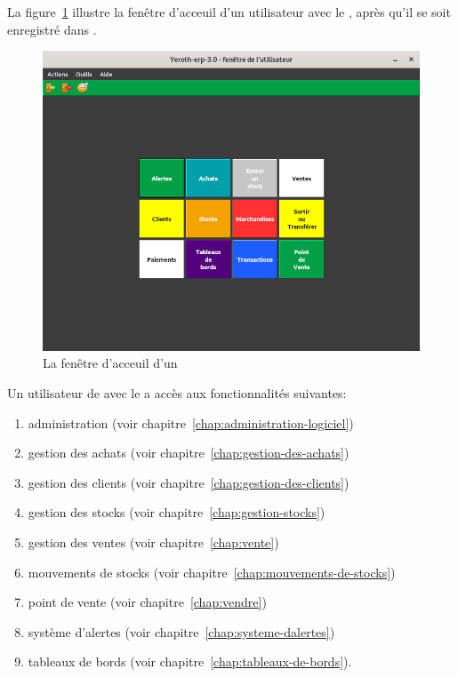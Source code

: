 \label{sec:utilisateurs-lepatron}

La figure~\ref{fig:yeren-fenetre-patron} illustre la fen\^etre
d'acceuil d'un utilisateur avec le \role \manager, 
apr\`es qu'il se soit enregistr\'e dans \yeroth.\\

\begin{figure}[!htbp]
\centering
\includegraphics[scale=0.63]{images/yeroth-fenetre-manager.png}
\caption{La fen\^etre d'acceuil d'un \manager}
\label{fig:yeren-fenetre-patron}
\end{figure}

Un utilisateur de \yeroth avec le \role \manager a acc\`es
aux fonctionnalit\'es suivantes:

\begin{enumerate}[1)]
	\item administration (voir chapitre~\ref{chap:administration-logiciel})
	\item gestion des achats (voir chapitre~\ref{chap:gestion-des-achats})
	\item gestion des clients (voir chapitre~\ref{chap:gestion-des-clients})
	\item gestion des stocks (voir chapitre~\ref{chap:gestion-stocks})
	\item gestion des ventes (voir chapitre~\ref{chap:vente})	
	\item mouvements de stocks (voir chapitre~\ref{chap:mouvements-de-stocks})
	\item point de vente (voir chapitre~\ref{chap:vendre})	
	\item syst\`eme d'alertes (voir chapitre~\ref{chap:systeme-dalertes})
	\item tableaux de bords (voir chapitre~\ref{chap:tableaux-de-bords}).\\
\end{enumerate}